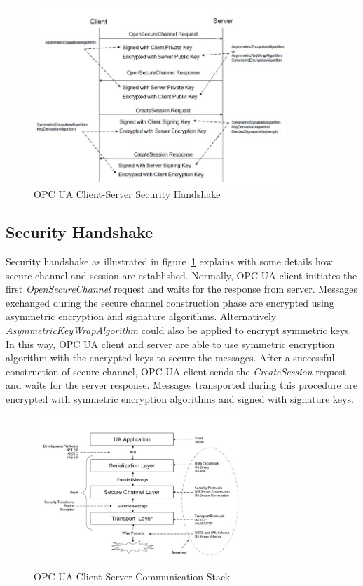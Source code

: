 \begin{figure}[!htbp]
	\centering
	\includegraphics[width=0.85\textwidth]{opc_ua_shs.jpg}
		\caption{OPC UA Client-Server Security Handshake \cite{O2}}
	\label{fig:opc_ua_cs_shs}
\end{figure}

\subsection{Security Handshake}
Security handshake as illustrated in figure~\ref{fig:opc_ua_cs_shs} explains with some details how secure channel and session are established. Normally, OPC UA client initiates the first \emph{OpenSecureChannel} request and waits for the response from server. Messages exchanged during the secure channel construction phase are encrypted using asymmetric encryption and signature algorithms. Alternatively \emph{AsymmetricKeyWrapAlgorithm} could also be applied to encrypt symmetric keys. In this way, OPC UA client and server are able to use symmetric encryption algorithm with the encrypted keys to secure the messages. After a successful construction of secure channel, OPC UA client sends the \emph{CreateSession} request and waits for the server response. Messages transported during this procedure are encrypted with symmetric encryption algorithms and signed with signature keys.
\begin{figure}[!htbp]
	\centering
	\includegraphics[width=0.7\textwidth]{opc_ua_commstack.jpg}
		\caption{OPC UA Client-Server Communication Stack \cite{O2}}
	\label{fig:opc_ua_commstack}
\end{figure}

